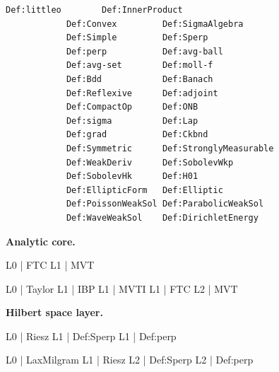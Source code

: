 \documentclass[11pt,reqno]{amsart}
\begin{document}
\begin{minipage}[t]{\linewidth}
		\smallskip
		
		\noindent\begin{minipage}[t]{\linewidth}
			\vspace{0pt}
			\begin{Verbatim}[frame=single,framerule=0.7pt,
			rulecolor=\color{blue!60!black},framesep=8pt,
			fontsize=\scriptsize,xleftmargin=6pt,xrightmargin=6pt]
			Def:littleo        Def:InnerProduct
			Def:Convex         Def:SigmaAlgebra
			Def:Simple         Def:Sperp
			Def:perp           Def:avg-ball
			Def:avg-set        Def:moll-f
			Def:Bdd            Def:Banach
			Def:Reflexive      Def:adjoint
			Def:CompactOp      Def:ONB
			Def:sigma          Def:Lap
			Def:grad           Def:Ckbnd
			Def:Symmetric      Def:StronglyMeasurable
			Def:WeakDeriv      Def:SobolevWkp
			Def:SobolevHk      Def:H01
			Def:EllipticForm   Def:Elliptic
			Def:PoissonWeakSol Def:ParabolicWeakSol
			Def:WaveWeakSol    Def:DirichletEnergy
			\end{Verbatim}
		\end{minipage}
		
	\end{minipage}
	
	\medskip
	
	\noindent\textbf{Analytic core.}
	
	\noindent%
	\begin{minipage}[t]{0.48\linewidth}
		\vspace{0pt}
		\begin{verbatimbox}
			L0 | FTC
			L1 |   MVT
		\end{verbatimbox}
	\end{minipage}\hfill
	\begin{minipage}[t]{0.48\linewidth}
		\vspace{0pt}
		\begin{verbatimbox}
			L0 | Taylor
			L1 |   IBP
			L1 |   MVTI
			L1 |   FTC
			L2 |     MVT
		\end{verbatimbox}
	\end{minipage}
	
	\medskip
	
	\noindent\textbf{Hilbert space layer.}
	
	\noindent%
	\begin{minipage}[t]{0.48\linewidth}
		\vspace{0pt}
		\begin{verbatimbox}
			L0 | Riesz
			L1 |   Def:Sperp
			L1 |   Def:perp
		\end{verbatimbox}
	\end{minipage}\hfill
	\begin{minipage}[t]{0.48\linewidth}
		\vspace{0pt}
		\begin{verbatimbox}
			L0 | LaxMilgram
			L1 |   Riesz
			L2 |     Def:Sperp
			L2 |     Def:perp
		\end{verbatimbox}
	\end{minipage}
	
\end{document}
